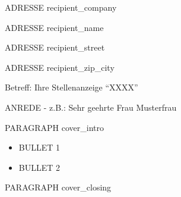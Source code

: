 ADRESSE recipient_company

ADRESSE recipient_name

ADRESSE recipient_street

ADRESSE recipient_zip_city

Betreff: Ihre Stellenanzeige \enquote{XXXX}

ANREDE - z.B.: Sehr geehrte Frau Musterfrau

PARAGRAPH cover_intro

\begin{itemize}
\item BULLET 1
\item BULLET 2
\end{itemize}

PARAGRAPH cover_closing

\Beispielmakro

\Beispielmakro

\Beispielmakro

